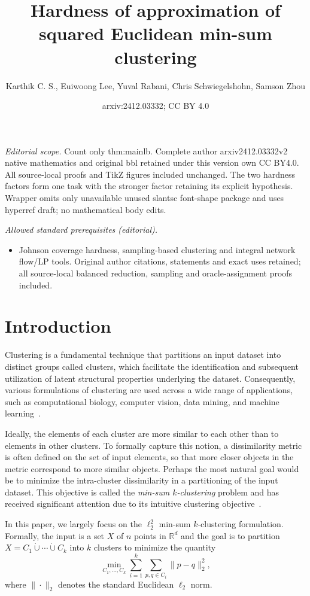\documentclass[10pt,a4paper]{amsart}
\title{Hardness of approximation of squared Euclidean min-sum clustering}
\author{Karthik C. S., Euiwoong Lee, Yuval Rabani, Chris Schwiegelshohn, Samson Zhou}
\date{arxiv:2412.03332; CC BY 4.0}
\begin{document}
\maketitle
\noindent\textit{Editorial scope.} Count only thm:mainlb. Complete author arxiv2412.03332v2 native mathematics and original bbl retained under this version own CC BY4.0. All source-local proofs and TikZ figures included unchanged. The two hardness factors form one task with the stronger factor retaining its explicit hypothesis. Wrapper omits only unavailable unused slantsc font-shape package and uses hyperref draft; no mathematical body edits.\par\medskip
\noindent\textit{Allowed standard prerequisites (editorial).}\begin{itemize}
\item Johnson coverage hardness, sampling-based clustering and integral network flow/LP tools. Original author citations, statements and exact uses retained; all source-local balanced reduction, sampling and oracle-assignment proofs included.
\end{itemize}\medskip
\section{Introduction}
Clustering is a fundamental technique that partitions an input dataset into distinct groups called clusters, which facilitate the identification and subsequent utilization of latent structural properties underlying the dataset. 
Consequently, various formulations of clustering are used across a wide range of applications, such as computational biology, computer vision, data mining, and machine learning~\cite{jain1999data,xu2005survey}. 

Ideally, the elements of each cluster are more similar to each other than to elements in other clusters. 
To formally capture this notion, a dissimilarity metric is often defined on the set of input elements, so that more closer objects in the metric correspond to more similar objects. 
Perhaps the most natural goal would be to minimize the intra-cluster dissimilarity in a partitioning of the input dataset. 
This objective is called the \emph{min-sum $k$-clustering} problem and has received significant attention due to its intuitive clustering objective~\cite{Guttmann-BeckH98a,Indyk99,Matousek00,Schulman00,BartalCR01,VegaKKR03,CzumajS07,AloiseDHP09,BehsazFSS19,BanerjeeOR21,Cohen-AddadSL21}. 

In this paper, we largely focus on the $\ell_2^2$ min-sum $k$-clustering formulation. 
Formally, the input is a set $X$ of $n$ points in $\mathbb{R}^d$ and the goal is to partition $X=C_1\dot\cup\cdots\dot\cup C_k$ into $k$ clusters to minimize the quantity
\[\min_{C_1,\ldots,C_k}\sum_{i=1}^k\sum_{p,q\in C_i}\|p-q\|_2^2,\]
where $\|\cdot\|_2$ denotes the standard Euclidean $\ell_2$ norm. 
\end{document}
